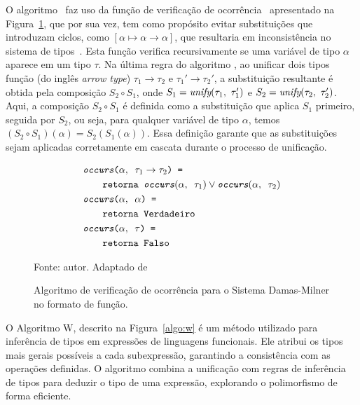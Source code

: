 O algoritmo \Unify\ faz uso da função de verificação de ocorrência \Occurs\ apresentado na Figura~\ref{algo:occurs}, que por sua vez, tem como propósito evitar substituições que introduzam ciclos, como $[\alpha\mapsto\alpha\to\alpha]$, que resultaria em inconsistência no sistema de tipos~\cite{ribeiro2016mechanized}.
Esta função verifica recursivamente se uma variável de tipo $\alpha$ aparece em um tipo $\tau$.
Na última regra do algoritmo \Unify, ao unificar dois tipos função (do inglês \textit{arrow type}) $\tau_1 \to \tau_2$ e $\tau_1' \to \tau_2'$, a substituição resultante é obtida pela composição $S_2 \circ S_1$, onde $S_1 = \textit{unify}(\tau_1,\ \tau_1')$ e $S_2 = \textit{unify}(\tau_2,\ \tau_2')$.
Aqui, a composição $S_2 \circ S_1$ é definida como a substituição que aplica $S_1$ primeiro, seguida por $S_2$, ou seja, para qualquer variável de tipo $\alpha$, temos $(S_2 \circ S_1)(\alpha) = S_2(S_1(\alpha))$.
Essa definição garante que as substituições sejam aplicadas corretamente em cascata durante o processo de unificação.
\begin{figure}[ht!]
  \centering
  \begin{align*}
     & \texttt{\ensuremath{\textit{occurs}}($\alpha, \texttt{ } \tau_1 \to \tau_2$) = }                                                       \\
     & \qquad{}\texttt{\ensuremath{\text{retorna}}\ensuremath{\texttt{ }}$\textit{occurs}(\alpha, \texttt{ } \tau_1) \lor \textit{occurs}(\alpha, \texttt{ }\tau_2)$} \\
     & \texttt{\ensuremath{\textit{occurs}}($\alpha, \texttt{ } \alpha$) = }                                                                  \\
     & \qquad{}\texttt{\ensuremath{\text{retorna}}\ensuremath{\texttt{ }}\ensuremath{\texttt{Verdadeiro}}}                                                                         \\
     & \texttt{\ensuremath{\textit{occurs}}($\alpha, \texttt{ } \tau$) = }                                                                    \\
     & \qquad{}\texttt{\ensuremath{\text{retorna}}\ensuremath{\texttt{ }}\ensuremath{\texttt{Falso}}}
  \end{align*}
  \caption{Algoritmo de verificação de ocorrência para o Sistema Damas-Milner no formato de função.}
  \small{Fonte: autor. Adaptado de~\cite{ribeiro2016mechanized}}\label{algo:occurs}
\end{figure}

O Algoritmo W, descrito na Figura~\ref{algo:w} é um método utilizado para inferência de tipos em expressões de linguagens funcionais.
Ele atribui os tipos mais gerais possíveis a cada subexpressão, garantindo a consistência com as operações definidas.
O algoritmo combina a unificação com regras de inferência de tipos para deduzir o tipo de uma expressão, explorando o polimorfismo de forma eficiente.

